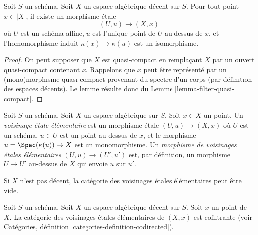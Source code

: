 \begin{lemma}
\label{lemma-decent-space-elementary-etale-neighbourhood}
Soit $S$ un schéma. Soit $X$ un espace algébrique décent sur $S$.
Pour tout point $x \in |X|$, il existe un morphisme étale
$$
(U, u) \longrightarrow (X, x)
$$
où $U$ est un schéma affine, $u$ est l'unique point de $U$ au-dessus de
$x$, et l'homomorphisme induit $\kappa(x) \to \kappa(u)$ est un isomorphisme.
\end{lemma}

\begin{proof}
On peut supposer que $X$ est quasi-compact en remplaçant $X$ par un ouvert
quasi-compact contenant $x$. Rappelons que $x$ peut être représenté par un
(mono)morphisme quasi-compact provenant du spectre d'un corps (par définition
des espaces décents). Le lemme résulte donc du
Lemme \ref{lemma-filter-quasi-compact}.
\end{proof}

\begin{definition}
\label{definition-elemenary-etale-neighbourhood}
Soit $S$ un schéma. Soit $X$ un espace algébrique sur $S$.
Soit $x \in X$ un point. Un {\it voisinage étale élémentaire}
est un morphisme étale $(U, u) \to (X, x)$ où $U$ est un schéma,
$u \in U$ est un point au-dessus de $x$, et le morphisme
$u = \Spec(\kappa(u)) \to X$ est un monomorphisme.
Un {\it morphisme de voisinages étales élémentaires}
$(U, u) \to (U', u')$ est, par définition, un morphisme $U \to U'$
au-dessus de $X$ qui envoie $u$ sur $u'$.
\end{definition}

\noindent
Si $X$ n'est pas décent, la catégorie des voisinages étales élémentaires
peut être vide.

\begin{lemma}
\label{lemma-elementary-etale-neighbourhoods}
Soit $S$ un schéma. Soit $X$ un espace algébrique décent sur $S$.
Soit $x$ un point de $X$.
La catégorie des voisinages étales élémentaires de $(X, x)$
est cofiltrante (voir
Catégories, définition \ref{categories-definition-codirected}).
\end{lemma}

